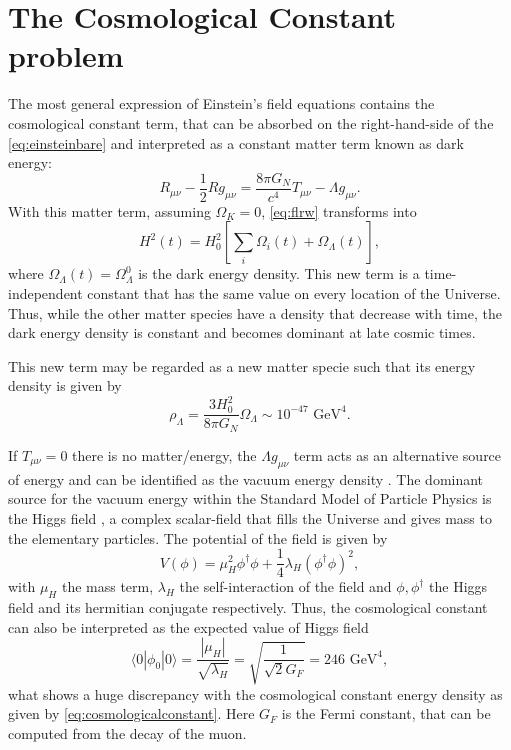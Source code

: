 \section{The Cosmological Constant problem}
The most general expression of Einstein's field equations contains the cosmological constant term, that can be absorbed on the right-hand-side of the \autoref{eq:einsteinbare} and interpreted as a constant matter term known as dark energy:
\begin{equation}
R_{\mu\nu}-\frac{1}{2}Rg_{\mu\nu} = \frac{8\pi G_N}{c^4}T_{\mu\nu}-\Lambda g_{\mu\nu}.
\end{equation}
With this matter term, assuming $\Omega_K=0$, \autoref{eq:flrw} transforms into
\begin{equation}
H^2(t) = H_0^2\left[\sum_i\Omega_i(t) +\Omega_\Lambda(t)\right],
\end{equation}
where $\Omega_\Lambda(t)=\Omega_\Lambda^0$ is the dark energy density. This new term is a time-independent constant that has the same value on every location of the Universe. Thus, while the other matter species have a density that decrease with time, the dark energy density is constant and becomes dominant at late cosmic times.
\newline

This new term may be regarded as a new matter specie such that its energy density is given by
\begin{equation}
\rho_\Lambda = \frac{3H_0^2}{8\pi G_N}\Omega_\Lambda\sim 10 ^{-47} \mbox{ GeV}^4.
\label{eq:cosmologicalconstant}
\end{equation}
\newline

If $T_{\mu\nu}=0$ there is no matter/energy, the $\Lambda g_{\mu\nu}$ term acts as an alternative source of energy and can be identified as the vacuum energy density \cite{0038-5670-11-3-A13,RevModPhys.61.1,2003PhR...380..235P,PhysRevD.72.021301}. The dominant source for the vacuum energy within the Standard Model of Particle Physics is the Higgs field \cite{1974JETPL..19..183L,PhysRevLett.34.777}, a complex scalar-field that fills the Universe and gives mass to the elementary particles. The potential of the field is given by
\begin{equation}
V(\phi) = \mu_H^2\phi^\dagger\phi+\frac{1}{4}\lambda_H(\phi^\dagger\phi)^2,
\end{equation}
with $\mu_H$ the mass term, $\lambda_H$ the self-interaction of the field and $\phi,\phi^\dagger$ the Higgs field and its hermitian conjugate respectively. Thus, the cosmological constant can also be interpreted as the expected value of Higgs field \cite{1974JETPL..19..183L,PhysRevLett.34.777}
\begin{equation}
\langle 0|\phi_0|0\rangle = \frac{|\mu_H|}{\sqrt{\lambda_H}}= \sqrt{\frac{1}{\sqrt{2}G_F}}= 246\mbox{ GeV}^4,
\end{equation}
what shows a huge discrepancy with the cosmological constant energy density as given by \autoref{eq:cosmologicalconstant}. Here $G_F$ is the Fermi constant, that can be computed from the decay of the muon.

